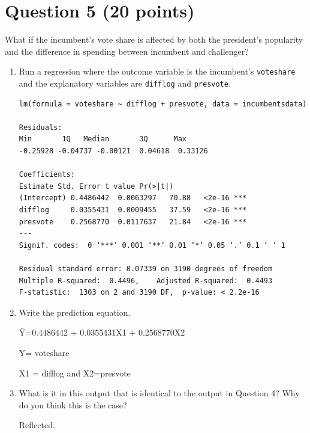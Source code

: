 \documentclass[12pt,letterpaper]{article}
\begin{document}
\section*{Question 5 (20 points)}
\noindent What if the incumbent's vote share is affected by both the president's popularity and the difference in spending between incumbent and challenger? 
	\begin{enumerate}
		\item Run a regression where the outcome variable is the incumbent's \texttt{voteshare} and the explanatory variables are \texttt{difflog} and \texttt{presvote}.
		
		\begin{Verbatim}
lm(formula = voteshare ~ difflog + presvote, data = incumbentsdata)

Residuals:
Min       1Q   Median       3Q      Max 
-0.25928 -0.04737 -0.00121  0.04618  0.33126 

Coefficients:
Estimate Std. Error t value Pr(>|t|)    
(Intercept) 0.4486442  0.0063297   70.88   <2e-16 ***
difflog     0.0355431  0.0009455   37.59   <2e-16 ***
presvote    0.2568770  0.0117637   21.84   <2e-16 ***
---
Signif. codes:  0 ‘***’ 0.001 ‘**’ 0.01 ‘*’ 0.05 ‘.’ 0.1 ‘ ’ 1

Residual standard error: 0.07339 on 3190 degrees of freedom
Multiple R-squared:  0.4496,	Adjusted R-squared:  0.4493 
F-statistic:  1303 on 2 and 3190 DF,  p-value: < 2.2e-16
		\end{Verbatim}
		\item Write the prediction equation.
		
		\^{Y}=0.4486442 + 0.0355431X1 + 0.2568770X2
		
		Y= voteshare
		
		X1 = difflog and X2=presvote
		\item What is it in this output that is identical to the output in Question 4? Why do you think this is the case?
		
		Reflected.
	\end{enumerate}
\end{document}
